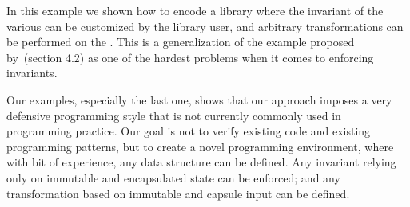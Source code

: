 In this example we shown how to encode a \Q@Graph@ library where the invariant of the various \Q@Node@s can be customized by the library user, and arbitrary transformations can be performed on the \Q@Graph@s.
This is a generalization of the example proposed by~\cite{Summers:2009:NFO:1562154.1562160}(section 4.2)
as one of the hardest problems when it comes to enforcing invariants.



Our examples, especially the last one, shows that our approach imposes a very defensive programming style
that is not currently commonly used in programming practice.
Our goal is not to verify existing code and existing programming patterns, but to create a novel programming environment, where with bit of experience, any data structure can be defined.
Any invariant relying only on immutable and encapsulated state can be enforced; and any transformation based on immutable and capsule input can be defined.

